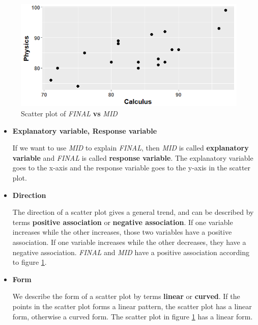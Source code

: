 \documentclass[a4paper, 12pt,twoside]{book}
\begin{document}
\begin{itemize}
\begin{itemize}
 \begin{figure}[H]
\centering
\includegraphics[scale=0.5]{ScatterPlot.png}
\caption{Scatter plot of \textit{FINAL} \textbf{vs} \textit{MID}}
\label{ScatterPlot}
\end{figure}

\begin{itemize}
 \item \textbf{Explanatory variable, Response variable}
 \vspace{0.6cm}
 
 If we want to use \textit{MID} to explain \textit{FINAL}, then \textit{MID} is called \textbf{explanatory variable} and \textit{FINAL} is called \textbf{response variable}. The explanatory variable goes to the x-axis and the response variable goes to the y-axis in the scatter plot.
 \vspace{0.6cm}
 
 \item \textbf{Direction}
 \vspace{0.6cm}
 
 The direction of a scatter plot gives a general trend, and can be described by terms \textbf{positive association} or \textbf{negative association}. If one variable increases while the other increases, those two variables have a positive association. If one variable increases while the other decreases, they have a negative association. \textit{FINAL} and \textit{MID} have a positive association according to figure \ref{ScatterPlot}.
 
  \vspace{0.6cm}
 
 \item \textbf{Form}
 \vspace{0.6cm}
 
We describe the form of a scatter plot by terms \textbf{linear} or \textbf{curved}. If the points in the scatter plot forms a linear pattern, the scatter plot has a linear form, otherwise a curved form. The scatter plot in figure \ref{ScatterPlot} has a  linear form.
\vspace{0.6cm}


\end{itemize}
\end{itemize}
\end{itemize}
\end{document}
